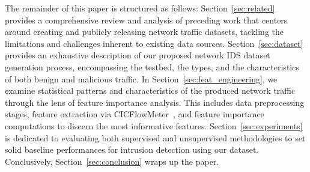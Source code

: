 \documentclass[lettersize,journal]{IEEEtran}
\begin{document}
The remainder of this paper is structured as follows: Section~\ref{sec:related} provides a comprehensive review and analysis of preceding work that centers around creating and publicly releasing network traffic datasets, tackling the limitations and challenges inherent to existing data sources. Section~\ref{sec:dataset} provides an exhaustive description of our proposed network IDS dataset generation process, encompassing the testbed, the types, and the characteristics of both benign and malicious traffic. In Section~\ref{sec:feat_engineering}, we examine statistical patterns and characteristics of the produced network traffic through the lens of feature importance analysis. This includes data preprocessing stages, feature extraction via CICFlowMeter~\cite{draper2016CICFlow}, and feature importance computations to discern the most informative features. Section~\ref{sec:experiments} is dedicated to evaluating both supervised and unsupervised methodologies to set solid baseline performances for intrusion detection using our dataset. Conclusively, Section~\ref{sec:conclusion} wraps up the paper. 
\end{document}
